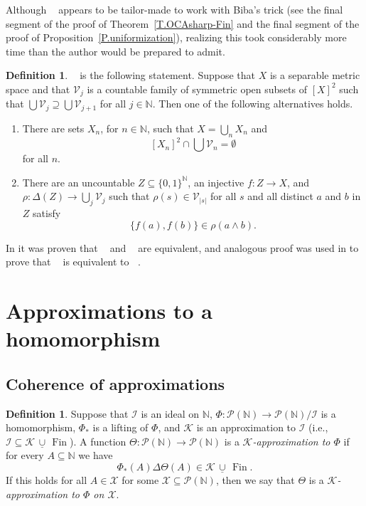 \documentclass{amsart}
\def\N{\mathbb N}                        %
\def\Fin{{\rm Fin}}   %
\theoremstyle{definition}
\newtheorem{definition}[proposition]{Definition}
\theoremstyle{remark}
\def\twoo{\{0,1\}^{\N}}
\newcommand{\ucup}{\,\underline{\cup}\,}
\def\Fin{\operatorname{Fin}}
\newcommand{\cK}{{\mathcal K}}
\newcommand{\cP}{\mathcal P}
\newcommand{\bbN}{\mathbb N}
\newcommand{\cI}{{\mathcal I}} %
\newcommand{\cV}{\mathcal V}
\newcommand{\cX}{\mathcal X}
\DeclareMathOperator{\OCAT}{OCA_T}
\DeclareMathOperator{\OCAinfty}{OCA_\infty}
\DeclareMathOperator{\OCAsharp}{OCA^\#}
\newcommand{\cPN}{\cP(\bbN)}
\numberwithin{claim}{subsection}
\begin{document}
Although $\OCAsharp$ appears to be tailor-made to work with Biba’s trick (see the final segment of the proof of Theorem~\ref{T.OCAsharp-Fin}  and the final segment of the proof of Proposition~\ref{P.uniformization}), realizing this took considerably more time than the author would be prepared to admit. 

\begin{definition} \label{Def.OCAsharp} 
	$\OCAsharp$ is the following statement. Suppose that $X$ is a separable metric space and that $\cV_j$ is a countable family of symmetric open subsets of $[X]^2$ such that $\bigcup\cV_j\supseteq \bigcup\cV_{j+1}$ for all $j\in \bbN$. 
	Then one of the following alternatives holds. 
	\begin{enumerate}
		\item \label{OCAsharp.1} There are sets $X_n$, for $n\in \bbN$, such that $X=\bigcup_n X_n$ and 
		\[
		[X_n]^2\cap\bigcup\cV_n =\emptyset
		\] 
		for all $n$. 
		\item\label{OCAsharp.2} There are an uncountable $Z\subseteq \twoo$, an injective $f\colon Z\to X$, and $\rho\colon \Delta(Z)\to \bigcup_j \cV_j$  such that $\rho(s)\in \cV_{|s|}$ for all $s$ and all distinct $a$ and $b$ in $Z$ satisfy
		\[
		\{f(a),f(b)\}\in \rho(a\wedge b). 
		\]
	\end{enumerate}
\end{definition}




In \cite[\S 5]{moore2021some} it was proven that $\OCAT$ and $\OCAinfty$ are equivalent, and analogous proof was used in \cite[Theorem~3.3]{de2023trivial} to prove that $\OCAsharp$ is equivalent to $\OCAT$. 



\section{Approximations to a homomorphism}

\subsection{Coherence of approximations}
\label{S.Coherence}
\begin{definition}
Suppose that $\cI$ is an ideal on $\bbN$, $\Phi\colon \cP(\bbN)\to \cP(\bbN)/\cI$ is a homomorphism, $\Phi_*$ is a lifting of $\Phi$,  and $\cK$ is an approximation to $\cI$ (i.e., $\cI\subseteq \cK\ucup \Fin$). A function $\Theta\colon \cPN\to \cPN$ is a \emph{$\cK$-approximation to $\Phi$} if for every $A\subseteq \bbN$ we have 
\[
\Phi_*(A)\Delta \Theta(A)\in \cK\ucup \Fin. 
\]
If this holds for all $A\in \cX$ for some $\cX\subseteq \cPN$, then we say that $\Theta$ is a \emph{$\cK$-approximation to $\Phi$ on $\cX$}. 
\end{definition}
\end{document}

